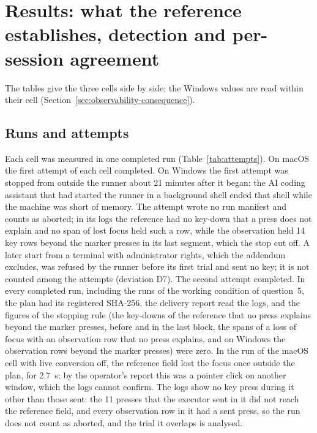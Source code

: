 
\section{Results: what the reference establishes, detection and per-session agreement}
\label{sec:results}

The tables give the three cells side by side; the Windows values are read within their cell
(Section~\ref{sec:observability-consequence}).

\subsection{Runs and attempts}
\label{sec:results-attempts}

Each cell was measured in one completed run (Table~\ref{tab:attempts}). On macOS the first attempt of each cell
completed. On Windows the first attempt was stopped from outside the runner about 21 minutes after it began: the AI
coding assistant that had started the runner in a background shell ended that shell while the machine was short of
memory. The attempt wrote no run manifest and counts as aborted; in its logs the reference had no key-down that a press
does not explain and no span of lost focus held such a row, while the observation held 14 key rows beyond the marker
presses in its last segment, which the stop cut off. A later start from a terminal with administrator rights, which the
addendum excludes, was refused by the runner before its first trial and sent no key; it is not counted among the
attempts (deviation D7). The second attempt completed. In every completed run, including the runs of the working
condition of question~5, the plan had its registered SHA-256, the delivery report read the logs, and the figures of the
stopping rule (the key-downs of the reference that no press explains beyond the marker presses, before and in the last
block, the spans of a loss of focus with an observation row that no press explains, and on Windows the observation rows
beyond the marker presses) were zero. In the run of the macOS cell with live conversion off, the reference field lost
the focus once outside the plan, for 2.7~s; by the operator's report this was a pointer click on another window, which
the logs cannot confirm. The logs show no key press during it other than those sent: the 11 presses that the executor
sent in it did not reach the reference field, and every observation row in it had a sent press, so the run does not
count as aborted, and the trial it overlaps is analysed.

